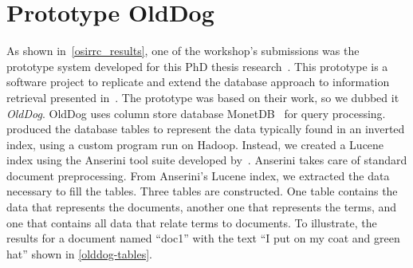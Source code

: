 \section{Prototype OldDog}
As shown in~\cref{osirrc_results}, one of the workshop's submissions was the prototype system developed for this PhD thesis research~\citep{olddog-docker}. This prototype is a software project to replicate and extend the database approach to information retrieval presented in~\citet{OldDog}. The prototype was based on their work, so we dubbed it \emph{OldDog}. OldDog uses column store database MonetDB~\citep{monet} for query processing. 
 produced the database tables to represent the data typically found in an inverted index, using a custom program run on Hadoop.
Instead, we created a Lucene index using the Anserini tool suite developed by~\citet{anserini}. Anserini takes care of standard document preprocessing. From Anserini's Lucene index, we extracted the data necessary to fill the tables. 
Three tables are constructed. One table contains the data that represents the documents, another one that represents the terms, and one that contains all data that relate terms to documents. To illustrate, the results for a document named ``doc1'' with the text ``I put on my coat and green hat'' shown in \cref{olddog-tables}. 

